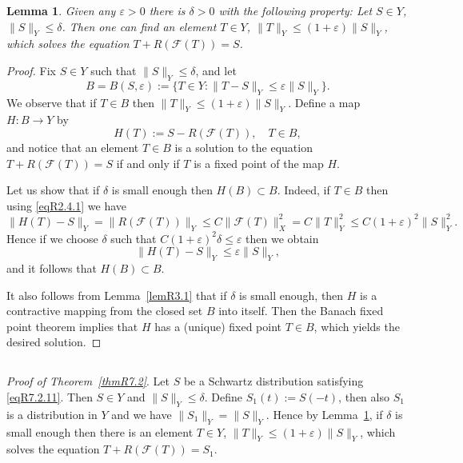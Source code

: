 \documentclass[reqno,a4paper,12pt]{amsart}
\numberwithin{equation}{section}
\numberwithin{figure}{section}
\newcommand\F{\mathcal{F}}
\newcommand\1{\mathds{1}}
\newcommand\eps{\varepsilon}
\renewcommand\le{\leqslant}
\renewcommand\leq{\leqslant}
\theoremstyle{plain}
\newtheorem{lem}[thm]{Lemma}
\newcommand{\thmref}[1]{Theorem~\ref{#1}}
\newcommand{\lemref}[1]{Lemma~\ref{#1}}
\theoremstyle{definition}
\begin{document}
\begin{lem}
\label{lemR4.2}
Given any $\eps>0$ there is 
$\delta>0$ with the following property: 
Let $S \in Y$, 
$\|S\|_Y \le  \delta$. Then one can find an element
$T \in Y$,  $\|T\|_Y \le (1+\eps)\|S\|_Y$,  which solves the
equation  $T + R(\F(T)) = S$.
\end{lem}


 \begin{proof} 
Fix $S \in Y$ such that  $\|S\|_Y \le \delta$,
and let 
\[
B = B(S,\eps) :=\{ T \in Y : \|T-S\|_Y \le \eps \|S\|_Y\}.
\]
We observe that if $T \in B$ then  $\|T\|_Y \le (1+\eps) \|S\|_Y$.
Define a map $H: B \to Y$ by
\[
H(T) := S - R(\F(T)), \quad T \in B,
\]
and notice that an element $T \in B$ is a solution to the equation
$T + R(\F(T)) = S$ 
if and only if $T$ is a fixed point of the map $H$.
 
Let us show that if $\delta$ is small enough then $H(B)\subset B$.
 Indeed, if $T \in B$ then using \eqref{eqR2.4.1} we have
\[
\|H(T)-S\|_Y = \|R(\F(T))\|_Y 
\leq C \|\F(T)\|^2_X =
 C \|T\|^2_Y \leq C (1+\eps)^2 \|S\|^2_Y.
\]
Hence if we choose $\delta$ such that 
$C(1+\eps)^2 \delta \leq \eps$ then
we obtain
\[
\|H(T)-S\|_Y \leq \eps \|S\|_Y,
\]
and it follows that $H(B)\subset B$.
 
It also follows  from \lemref{lemR3.1} 
that if $\delta$ is small enough, then $H$ is a contractive 
mapping from the closed set $B$ into itself.
Then the Banach fixed point theorem implies that
$H$ has a (unique) fixed point $T \in B$,
which yields the desired solution.
 \end{proof}
 



\subsection{}
\emph{Proof of \thmref{thmR7.2}}.
Let $S$ be a Schwartz distribution satisfying
\eqref{eqR7.2.11}. Then $S \in Y$
and $\|S\|_Y \le  \delta$. Define
$S_1(t) := S(-t)$, then also $S_1$ is
a distribution in $Y$ and we have $\|S_1\|_Y = \|S\|_Y$.
Hence by \lemref{lemR4.2}, if $\delta$ is small 
enough then there is an element
$T \in Y$,  $\|T\|_Y \le  (1+\eps)\|S\|_Y$,  which solves the
equation  $T + R(\F(T)) = S_1$.
\end{document}
